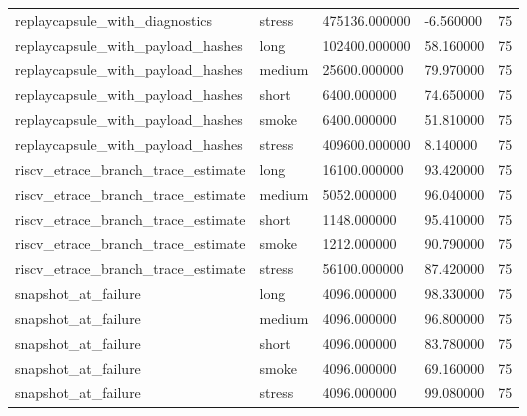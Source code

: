 \begin{tabular}{lllll}
replaycapsule\_with\_diagnostics & stress & 475136.000000 & -6.560000 & 75 \\
replaycapsule\_with\_payload\_hashes & long & 102400.000000 & 58.160000 & 75 \\
replaycapsule\_with\_payload\_hashes & medium & 25600.000000 & 79.970000 & 75 \\
replaycapsule\_with\_payload\_hashes & short & 6400.000000 & 74.650000 & 75 \\
replaycapsule\_with\_payload\_hashes & smoke & 6400.000000 & 51.810000 & 75 \\
replaycapsule\_with\_payload\_hashes & stress & 409600.000000 & 8.140000 & 75 \\
riscv\_etrace\_branch\_trace\_estimate & long & 16100.000000 & 93.420000 & 75 \\
riscv\_etrace\_branch\_trace\_estimate & medium & 5052.000000 & 96.040000 & 75 \\
riscv\_etrace\_branch\_trace\_estimate & short & 1148.000000 & 95.410000 & 75 \\
riscv\_etrace\_branch\_trace\_estimate & smoke & 1212.000000 & 90.790000 & 75 \\
riscv\_etrace\_branch\_trace\_estimate & stress & 56100.000000 & 87.420000 & 75 \\
snapshot\_at\_failure & long & 4096.000000 & 98.330000 & 75 \\
snapshot\_at\_failure & medium & 4096.000000 & 96.800000 & 75 \\
snapshot\_at\_failure & short & 4096.000000 & 83.780000 & 75 \\
snapshot\_at\_failure & smoke & 4096.000000 & 69.160000 & 75 \\
snapshot\_at\_failure & stress & 4096.000000 & 99.080000 & 75 \\
 \hline
\end{tabular}
